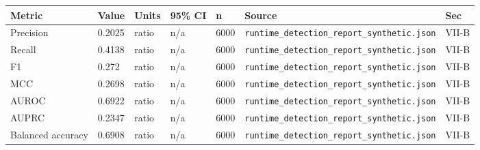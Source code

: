 \begin{tabular}{lllllll}
\hline
Metric & Value & Units & 95\% CI & n & Source & Sec \\
\hline
Precision & 0.2025 & ratio & n/a & 6000 & \texttt{runtime_detection_report_synthetic.json} & VII-B \\
Recall & 0.4138 & ratio & n/a & 6000 & \texttt{runtime_detection_report_synthetic.json} & VII-B \\
F1 & 0.272 & ratio & n/a & 6000 & \texttt{runtime_detection_report_synthetic.json} & VII-B \\
MCC & 0.2698 & ratio & n/a & 6000 & \texttt{runtime_detection_report_synthetic.json} & VII-B \\
AUROC & 0.6922 & ratio & n/a & 6000 & \texttt{runtime_detection_report_synthetic.json} & VII-B \\
AUPRC & 0.2347 & ratio & n/a & 6000 & \texttt{runtime_detection_report_synthetic.json} & VII-B \\
Balanced accuracy & 0.6908 & ratio & n/a & 6000 & \texttt{runtime_detection_report_synthetic.json} & VII-B \\
\hline
\end{tabular}
